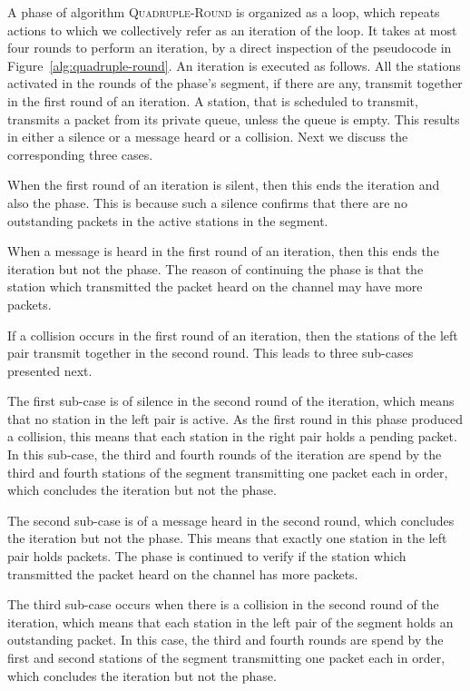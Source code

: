 \documentclass[11pt]{article}
\begin{document}
A phase of algorithm \textsc{Quadruple-Round} is organized as a loop, which repeats actions to which we collectively refer as an iteration of the loop.
It takes at most four rounds to perform an iteration, by a direct inspection of the pseudocode in Figure~\ref{alg:quadruple-round}.
An iteration is executed as follows.
All the stations activated in the rounds of the phase's segment, if there are any, transmit together in the first round of an iteration.
A station, that is scheduled to transmit, transmits a packet from its private queue, unless the queue  is empty.
This results in either a silence or a message heard or a collision. 
Next we discuss the corresponding three cases.

When the first round of an iteration is silent, then this ends the iteration and also the phase.
This is because such a silence confirms that there are no outstanding packets in the active stations  in the segment.

When a message is heard in the first round of an iteration, then this ends the iteration but not the phase.
The reason of continuing the phase is that the station which transmitted the packet heard on the channel may have more packets.

If a collision occurs in the first round of an iteration, then the stations of the left pair transmit together in the second round.
This leads to three sub-cases presented next.

The first sub-case is of silence in the second round of the iteration, which means that no station in the left pair is active.
As the first round in this phase  produced a collision, this means that each station in the right pair holds a pending packet.
In this sub-case, the third and fourth rounds of the iteration are spend by the third and fourth stations of the segment transmitting one packet each in order, which concludes the iteration but not the phase.

The second sub-case is of a message heard in the second round, which concludes the iteration but not the phase.
This means that exactly one station in the left pair holds packets.
The phase is continued to verify if the station which transmitted the packet heard on the channel has more packets.


The third sub-case occurs when there is a collision in the second round of the iteration, which means that each station in the left pair of the segment holds an outstanding packet.
In this case, the third and fourth rounds are spend by the first and second stations of the segment transmitting one packet each in order, which concludes the iteration but not the phase.
\end{document}
